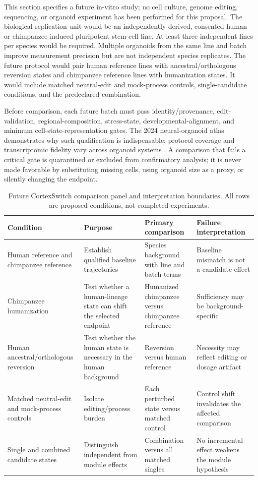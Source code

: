 \documentclass[conference]{IEEEtran}
\begin{document}
This section specifies a future in-vitro study; no cell culture, genome editing, sequencing, or organoid experiment has been performed for this proposal. The biological replication unit would be an independently derived, consented human or chimpanzee induced pluripotent stem-cell line. At least three independent lines per species would be required. Multiple organoids from the same line and batch improve measurement precision but are not independent species replicates. The future protocol would pair human reference lines with ancestral/orthologous reversion states and chimpanzee reference lines with humanization states. It would include matched neutral-edit and mock-process controls, single-candidate conditions, and the predeclared combination.

Before comparison, each future batch must pass identity/provenance, edit-validation, regional-composition, stress-state, developmental-alignment, and minimum cell-state-representation gates. The 2024 neural-organoid atlas demonstrates why such qualification is indispensable: protocol coverage and transcriptomic fidelity vary across organoid systems \cite{he2024}. A comparison that fails a critical gate is quarantined or excluded from confirmatory analysis; it is never made favorable by substituting missing cells, using organoid size as a proxy, or silently changing the endpoint.

\begin{table}[t]
\caption{Future CortexSwitch comparison panel and interpretation boundaries. All rows are proposed conditions, not completed experiments.}
\label{tab:panel}
\centering
\footnotesize
\renewcommand{\arraystretch}{1.12}
\begin{tabular}{|p{}|p{}|p{}|p{}|}
\hline
\textbf{Condition} & \textbf{Purpose} & \textbf{Primary comparison} & \textbf{Failure interpretation} \\
\hline
Human reference and chimpanzee reference & Establish qualified baseline trajectories & Species background with line and batch terms & Baseline mismatch is not a candidate effect \\
\hline
Chimpanzee humanization & Test whether a human-lineage state can shift the selected endpoint & Humanized chimpanzee versus chimpanzee reference & Sufficiency may be background-specific \\
\hline
Human ancestral/orthologous reversion & Test whether the human state is necessary in the human background & Reversion versus human reference & Necessity may reflect editing or dosage artifact \\
\hline
Matched neutral-edit and mock-process controls & Isolate editing/process burden & Each perturbed state versus matched control & Control shift invalidates the affected comparison \\
\hline
Single and combined candidate states & Distinguish independent from module effects & Combination versus all matched singles & No incremental effect weakens the module hypothesis \\
\hline
\end{tabular}
\end{table}
\end{document}
